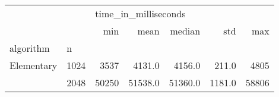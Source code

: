 \begin{tabular}{llrrrrr}
\toprule
           &      & \multicolumn{5}{l}{time\_in\_milliseconds} \\
           &      &                  min &     mean &   median &     std &    max \\
algorithm & n &                      &          &          &         &        \\
\midrule
Elementary & 1024 &                 3537 &   4131.0 &   4156.0 &   211.0 &   4805 \\
           & 2048 &                50250 &  51538.0 &  51360.0 &  1181.0 &  58806 \\
\bottomrule
\end{tabular}
